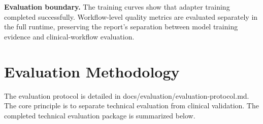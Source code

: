 \documentclass[11pt]{article}
\newcommand{\code}[1]{{\setlength{\fboxsep}{1.7pt}\colorbox{codebg}{\textcolor{codeink}{\small\ttfamily #1}}}}
\begin{document}
\textbf{Evaluation boundary.} The training curves show that adapter training completed successfully. Workflow-level quality metrics are evaluated separately in the full runtime, preserving the report's separation between model training evidence and clinical-workflow evaluation.


\section{Evaluation Methodology}

The evaluation protocol is detailed in \code{docs/evaluation/evaluation-protocol.md}. The core principle is to separate technical evaluation from clinical validation. The completed technical evaluation package is summarized below.
\end{document}
